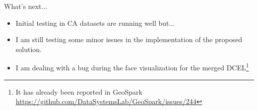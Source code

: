 \documentclass{beamer}
\begin{document}
\begin{frame}{What's next...}
    \begin{itemize}
        \item Initial testing in CA datasets are running well but...
        \item I am still testing some minor issues in the implementation of the proposed solution.
        \item I am dealing with a bug during the face visualization for the merged DCEL\footnote{It has already been reported in GeoSpark \url{https://github.com/DataSystemsLab/GeoSpark/issues/244}}
    \end{itemize}

\end{frame}
\end{document}
